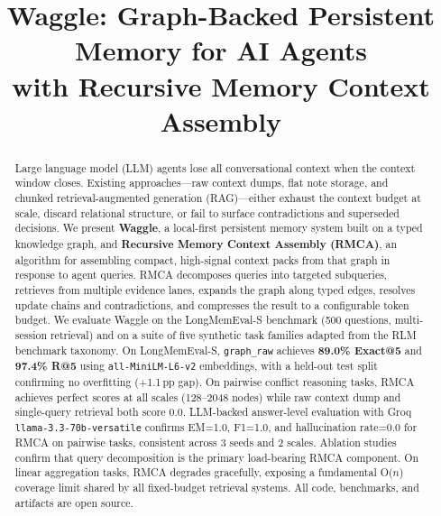 \documentclass[conference]{IEEEtran}
\begin{document}
\title{Waggle: Graph-Backed Persistent Memory for AI Agents\\
with Recursive Memory Context Assembly}

\author{
}

\maketitle

\begin{abstract}
Large language model (LLM) agents lose all conversational context when the context window closes.
Existing approaches---raw context dumps, flat note storage, and chunked retrieval-augmented
generation (RAG)---either exhaust the context budget at scale, discard relational structure,
or fail to surface contradictions and superseded decisions.
We present \textbf{Waggle}, a local-first persistent memory system built on a typed knowledge
graph, and \textbf{Recursive Memory Context Assembly (RMCA)}, an algorithm for assembling
compact, high-signal context packs from that graph in response to agent queries.
RMCA decomposes queries into targeted subqueries, retrieves from multiple evidence lanes,
expands the graph along typed edges, resolves update chains and contradictions, and compresses
the result to a configurable token budget.
We evaluate Waggle on the LongMemEval-S benchmark (500 questions, multi-session retrieval)
and on a suite of five synthetic task families adapted from the RLM benchmark taxonomy.
On LongMemEval-S, \texttt{graph\_raw} achieves \textbf{89.0\% Exact@5} and \textbf{97.4\% R@5}
using \texttt{all-MiniLM-L6-v2} embeddings, with a held-out test split confirming no
overfitting (+1.1\,pp gap).
On pairwise conflict reasoning tasks, RMCA achieves perfect scores at all scales (128--2048 nodes)
while raw context dump and single-query retrieval both score 0.0.
LLM-backed answer-level evaluation with Groq \texttt{llama-3.3-70b-versatile} confirms
EM=1.0, F1=1.0, and hallucination rate=0.0 for RMCA on pairwise tasks, consistent across
3 seeds and 2 scales.
Ablation studies confirm that query decomposition is the primary load-bearing RMCA component.
On linear aggregation tasks, RMCA degrades gracefully, exposing a fundamental O($n$) coverage
limit shared by all fixed-budget retrieval systems.
All code, benchmarks, and artifacts are open source.
\end{abstract}
\end{document}
